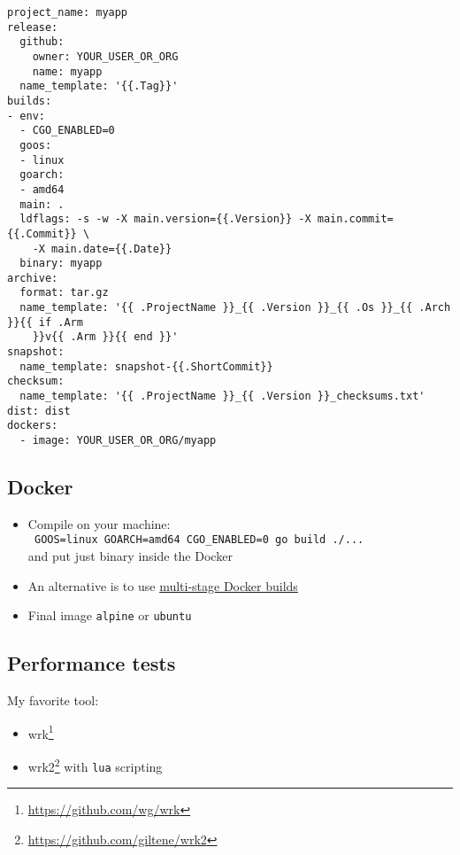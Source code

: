 \documentclass[11pt, letterpaper]{article}
\begin{document}
\begin{verbatim}
project_name: myapp
release:
  github:
    owner: YOUR_USER_OR_ORG
    name: myapp
  name_template: '{{.Tag}}'
builds:
- env:
  - CGO_ENABLED=0
  goos:
  - linux
  goarch:
  - amd64
  main: .
  ldflags: -s -w -X main.version={{.Version}} -X main.commit={{.Commit}} \
    -X main.date={{.Date}}
  binary: myapp
archive:
  format: tar.gz
  name_template: '{{ .ProjectName }}_{{ .Version }}_{{ .Os }}_{{ .Arch }}{{ if .Arm
    }}v{{ .Arm }}{{ end }}'
snapshot:
  name_template: snapshot-{{.ShortCommit}}
checksum:
  name_template: '{{ .ProjectName }}_{{ .Version }}_checksums.txt'
dist: dist
dockers:
  - image: YOUR_USER_OR_ORG/myapp
\end{verbatim}

\subsection{Docker}

\begin{itemize}
\item Compile on your machine:\\ \verb| GOOS=linux GOARCH=amd64 CGO_ENABLED=0 go build ./...| \\ and put just binary inside the Docker
\item An alternative is to use \href{https://docs.docker.com/develop/develop-images/multistage-build/}{multi-stage Docker builds}
\item Final image \verb|alpine| or \verb|ubuntu|
\end{itemize}

\subsection{Performance tests}

My favorite tool:

\begin{itemize}
  \item wrk\footnote{\href{https://github.com/wg/wrk}{https://github.com/wg/wrk}}
  \item wrk2\footnote{\href{https://github.com/giltene/wrk2}{https://github.com/giltene/wrk2}} with \verb|lua| scripting
\end{itemize}
\end{document}
